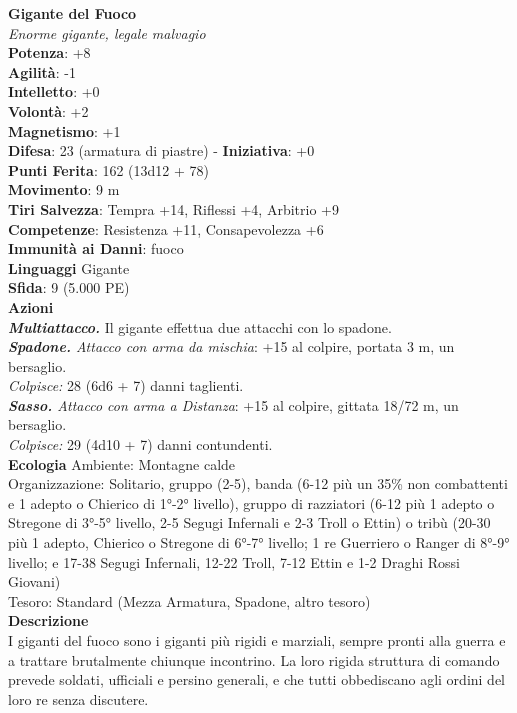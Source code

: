 \begin{multicols}{2}
\medskip\textbf{Gigante del Fuoco}\\
\emph{Enorme gigante, legale malvagio}\\
\textbf{Potenza}: +8\\
\textbf{Agilità}: -1\\
\textbf{Intelletto}: +0\\
\textbf{Volontà}: +2\\
\textbf{Magnetismo}: +1\\
\textbf{Difesa}: 23 (armatura di piastre) - \textbf{Iniziativa}: +0\\
\textbf{Punti Ferita}: 162 (13d12 + 78)\\
\textbf{Movimento}: 9 m\\
\textbf{Tiri Salvezza}: Tempra +14, Riflessi +4, Arbitrio +9\\
\textbf{Competenze}: Resistenza +11, Consapevolezza +6\\
\textbf{Immunità ai Danni}: fuoco\\
\textbf{Linguaggi} Gigante\\
\textbf{Sfida}: 9 (5.000 PE)\smallskip\\
\smallskip\textbf{Azioni}\\
\emph{\textbf{Multiattacco.}} Il gigante effettua due attacchi con lo spadone.\\
\emph{\textbf{Spadone.} Attacco con arma da mischia}: +15 al colpire, portata 3 m, un bersaglio.\\
\emph{Colpisce:} 28 (6d6 + 7) danni taglienti.\\
\emph{\textbf{Sasso.} Attacco con arma a Distanza}: +15 al colpire, gittata 18/72 m, un bersaglio.\\
\emph{Colpisce:} 29 (4d10 + 7) danni contundenti. \\
\textbf{Ecologia}
Ambiente: Montagne calde\\
Organizzazione: Solitario, gruppo (2-5), banda (6-12 più un 35\% non combattenti e 1 adepto o Chierico di 1°-2° livello), gruppo di razziatori (6-12 più 1 adepto o Stregone di 3°-5° livello, 2-5 Segugi Infernali e 2-3 Troll o Ettin) o tribù (20-30 più 1 adepto, Chierico o Stregone di 6°-7° livello; 1 re Guerriero o Ranger di 8°-9° livello; e 17-38 Segugi Infernali, 12-22 Troll, 7-12 Ettin e 1-2 Draghi Rossi Giovani)\\
Tesoro: Standard (Mezza Armatura, Spadone, altro tesoro)\\
\textbf{Descrizione}\\
I giganti del fuoco sono i giganti più rigidi e marziali, sempre pronti alla guerra e a trattare brutalmente chiunque incontrino. La loro rigida struttura di comando prevede soldati, ufficiali e persino generali, e che tutti obbediscano agli ordini del loro re senza discutere.\\


\end{multicols}
